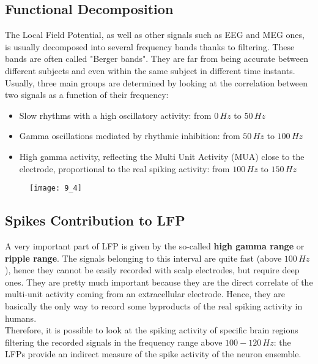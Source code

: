 \subsection{Functional Decomposition}
The Local Field Potential, as well as other signals such as EEG and MEG ones,
is usually decomposed into several frequency bands thanks to filtering.
These bands are often called "Berger bands". They are far from being accurate
between different subjects and even within the same subject in
different time instants. \\
Usually, three main groups are determined by looking at the correlation between
two signals as a function of their frequency:
\begin{itemize}
    \item Slow rhythms with a high oscillatory activity: from \(0\,Hz\) to \(50\,Hz\)
    \item Gamma oscillations mediated by rhythmic inhibition: from \(50\,Hz\)
          to \(100\,Hz\)
    \item High gamma activity, reflecting the Multi Unit Activity (MUA) close
          to the electrode, proportional to the real spiking activity:
          from \(100\,Hz\) to \(150\,Hz\)
\end{itemize}
\begin{figure}[H]
    \texttt{[image: 9\_4]}
    \centering
\end{figure}

\subsection{Spikes Contribution to LFP}
A very important part of LFP is given by the so-called \textbf{high gamma range} or
\textbf{ripple range}. The signals belonging to this interval are quite fast
(above \(100\,Hz\)), hence they cannot be easily recorded with scalp electrodes, but
require deep ones. They are pretty much important because they are the direct
correlate of the multi-unit activity coming from an extracellular electrode. Hence,
they are basically the only way to record some byproducts of the real spiking activity
in humans.\\
Therefore, it is possible to look at the spiking activity of specific brain regions
filtering the recorded signals in the frequency range above \(100-120\,Hz\): the LFPs
provide an indirect measure of the spike activity of the neuron ensemble.

